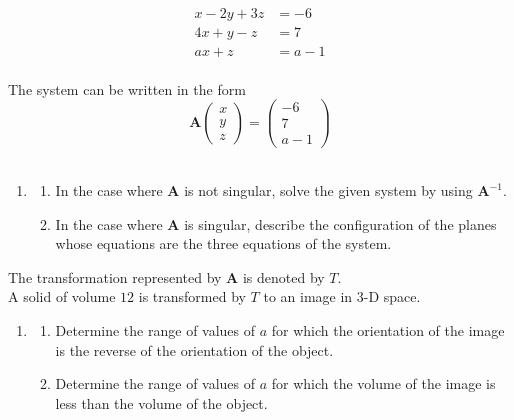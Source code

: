 \documentclass[leqno]{article}
\begin{document}
\begin{enumerate}[
  label=\textbf{\arabic*.},
  leftmargin=*,
  topsep=0pt,
  partopsep=0pt,
  parsep=0pt
]
\[
\begin{aligned}
x-2y+3z&=-6 \\
4x+y-z&=7 \\
ax+z&=a-1
\end{aligned}
\] \\

The system can be written in the form
\[
\mathbf{A}\begin{pmatrix}x \\ y \\ z\end{pmatrix}=\begin{pmatrix}-6 \\ 7 \\ a-1\end{pmatrix}
\] \\

\begin{enumerate}[label=\textbf{(\alph*)}, resume]
  \item
  \begin{enumerate}[label=(\roman*)]
    \item In the case where $\mathbf{A}$ is not singular, solve the given system by using $\mathbf{A}^{-1}$. 
    \item In the case where $\mathbf{A}$ is singular, describe the configuration of the planes whose equations are the three equations of the system.  \\
  \end{enumerate}
\end{enumerate}

The transformation represented by $\mathbf{A}$ is denoted by $T$. \\
A solid of volume $12$ is transformed by $T$ to an image in 3-D space. \\

\begin{enumerate}[label=\textbf{(\alph*)}, resume]
  \item
  \begin{enumerate}[label=(\roman*)]
    \item Determine the range of values of $a$ for which the orientation of the image is the reverse of the orientation of the object. 
    \item Determine the range of values of $a$ for which the volume of the image is less than the volume of the object.  \\
  \end{enumerate}
\end{enumerate}


\end{enumerate}
\end{document}
